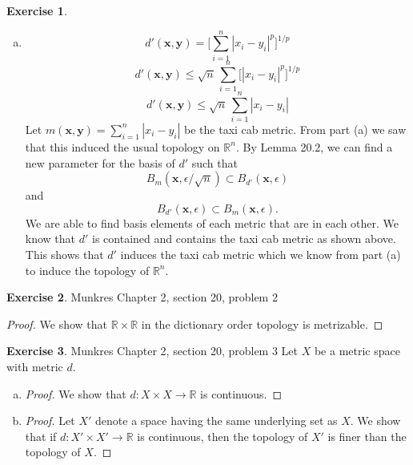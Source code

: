\documentclass[12pt]{article}
\theoremstyle{definition}
\newtheorem{exercise}{Exercise}
\begin{document}
\begin{exercise}
\begin{enumerate}[(a)]
\begin{proof}
		Since we were able to find basis elements of each metric that are in each other, this shows that $d'$ induces the usual topology of $\mathbb{R}^{n}$.
		\end{proof}
	Now, we sketch the basis elements under $d'$ when $n=2$. The basis elements have a radius of $\epsilon/2$. However, unlike the euclidean metric, the $d'$ metric is defined in a way such that distance is measured as if walking around the edges of little squares to get from one point to another. Thus, the basis elements of $d'$ are squares.
	\item \[d'(\mathbf{x},\mathbf{y})=\Bigg[\sum_{i=1}^{n}|x_i-y_i|^p\Bigg]^{1/p}\] 
	\[d'(\mathbf{x},\mathbf{y})\leq\sqrt{n}\,\sum_{i=1}^{n}\big[|x_i-y_i|^p\big]^{1/p}\]
	\[d'(\mathbf{x},\mathbf{y})\leq\sqrt{n}\,\sum_{i=1}^{n}|x_i-y_i|\]
	Let $m(\mathbf{x},\mathbf{y})=\sum_{i=1}^{n}|x_i-y_i|$ be the taxi cab metric. From part (a) we saw that this induced the usual topology on $\mathbb{R}^{n}$.  
	By Lemma 20.2, we can find a new parameter for the basis of $d'$ such that \[B_{m}(\mathbf{x},\epsilon/\sqrt{n})\subset B_{d'}(\mathbf{x},\epsilon)\]
	and \[B_{d'}(\mathbf{x},\epsilon)\subset B_{m}(\mathbf{x},\epsilon).\] 
	We are able to find basis elements of each metric that are in each other. We know that $d'$ is contained and contains the taxi cab metric as shown above. This shows that $d'$ induces the taxi cab metric which we know from part (a) to induce the topology of $\mathbb{R}^{n}$.
\end{enumerate}
\end{exercise}

\begin{exercise} Munkres Chapter 2, section 20, problem 2 
\begin{proof}
	We show that $\mathbb{R}\times\mathbb{R}$ in the dictionary order topology is metrizable. 
\end{proof}
\end{exercise}

\begin{exercise} Munkres Chapter 2, section 20, problem 3 \newline
	Let $X$ be a metric space with metric $d$. 
\begin{enumerate}[(a)]
	\item \begin{proof}
		We show that $d:X\times X\to\mathbb{R}$ is continuous. 
	\end{proof}
	\item \begin{proof}
		Let $X'$ denote a space having the same underlying set as $X$. We show that if $d:X'\times X'\to\mathbb{R}$ is continuous, then the topology of $X'$ is finer than the topology of $X$. 
	\end{proof} 
\end{enumerate}
\end{exercise}
\end{document}
